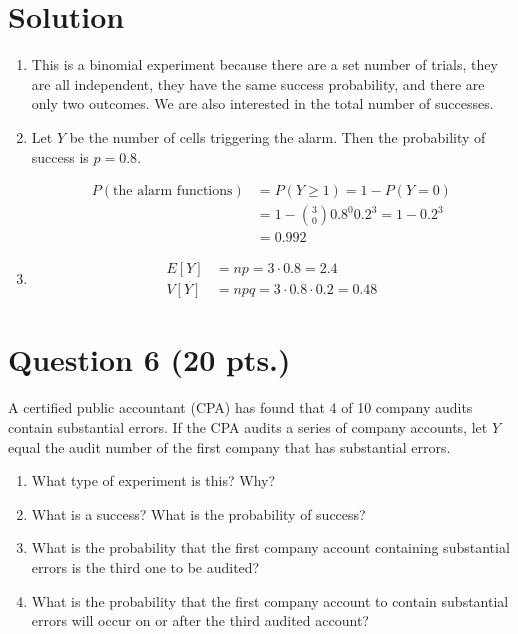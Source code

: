 \documentclass[11pt]{article}
\theoremstyle{definition}
\begin{document}
\section*{Solution}

\begin{enumerate}
	\item This is a binomial experiment because there are a set number of trials, they are all independent, they have the same success probability, and there are only two outcomes. We are also interested in the total number of successes.
	\item Let $Y$ be the number of cells triggering the alarm. Then the probability of success is $p=0.8$.
	
	$$
		\begin{aligned}
			P(\text{the alarm functions}) & = P(Y \geq 1) = 1 - P(Y=0) \\
			& = 1 - {3 \choose 0} 0.8^0 0.2^3 = 1-0.2^3 \\
			& = 0.992
		\end{aligned}
	$$
	\item
	$$
		\begin{aligned}
			E[Y] & = np = 3 \cdot 0.8 = 2.4 \\
			V[Y] & = npq = 3 \cdot 0.8 \cdot 0.2 = 0.48
		\end{aligned}
	$$
\end{enumerate}

\newpage

\section*{Question 6 (20 pts.)}

A certified public accountant (CPA) has found that 4 of 10 company audits contain substantial errors. If the CPA audits a series of company accounts, let $Y$ equal the audit number of the first company that has substantial errors.

\begin{enumerate}
	\item What type of experiment is this? Why?
	\item What is a success? What is the probability of success?
	\item What is the probability that the first company account containing substantial errors is the third one to be audited?
	\item What is the probability that the first company account to contain substantial errors will occur on or after the third audited account?
\end{enumerate}
\end{document}

